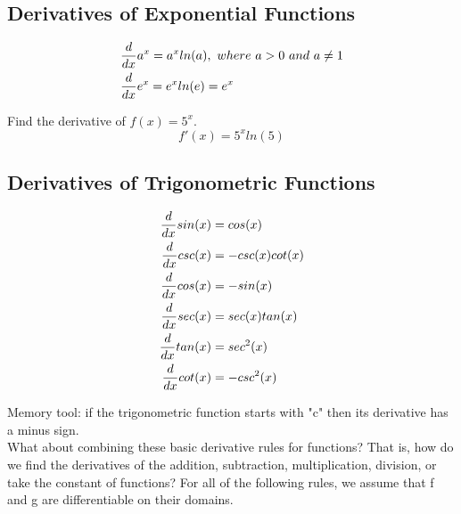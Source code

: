 \subsection{Derivatives of Exponential Functions}

\begin{theorem}
    \begin{align}
         & {d \over dx}a^x = a^xln(a),\ where\ a > 0\ and\ a \neq 1 \\
         & {d \over dx}e^x = e^xln(e) = e^x
    \end{align}
\end{theorem}

\begin{exercise}\nonumber
    Find the derivative of $ f(x) = 5^x $. \\

    $$
        f'(x) = 5^xln(5)
    $$
\end{exercise}

\subsection{Derivatives of Trigonometric Functions}

\begin{theorem}
    \begin{align}
        {d \over dx}sin(x) & = cos(x)        \\
        {d \over dx}csc(x) & = -csc(x)cot(x) \\
        {d \over dx}cos(x) & = -sin(x)       \\
        {d \over dx}sec(x) & = sec(x)tan(x)  \\
        {d \over dx}tan(x) & = sec^2(x)      \\
        {d \over dx}cot(x) & = -csc^2(x)
    \end{align}
\end{theorem}

Memory tool: if the trigonometric function starts with "c" then its derivative has a minus sign. \\

What about combining these basic derivative rules for functions? That is, how do we find the derivatives of the addition, subtraction, multiplication, division, or take the constant of functions? For all of the following rules, we assume that f and g are differentiable on their domains. \\

